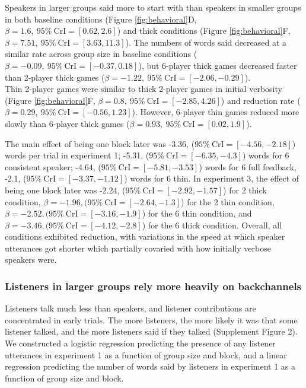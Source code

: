 \documentclass[
  english,
  a4paper,
]{article}
\begin{document}
Speakers in larger groups said more to start with than speakers in smaller groups in both baseline conditions (Figure \ref{fig:behavioral}D, \(\beta=1.6,\:95\%\:\mathrm{CrI}=[0.62, 2.6]\)) and thick conditions (Figure \ref{fig:behavioral}F, \(\beta=7.51,\:95\%\:\mathrm{CrI}=[3.63, 11.3]\)). The numbers of words said decreased at a similar rate across group size in baseline conditions (\(\beta=-0.09,\:95\%\:\mathrm{CrI}=[-0.37, 0.18]\)), but 6-player thick games decreased faster than 2-player thick games (\(\beta=-1.22,\:95\%\:\mathrm{CrI}=[-2.06, -0.29]\)).\\
Thin 2-player games were similar to thick 2-player games in initial verbosity (Figure \ref{fig:behavioral}F, \(\beta=0.8,\:95\%\:\mathrm{CrI}=[-2.85, 4.26]\)) and reduction rate ( \(\beta=0.29,\:95\%\:\mathrm{CrI}=[-0.56, 1.23]\)).
However, 6-player thin games reduced more slowly than 6-player thick games (\(\beta=0.93,\:95\%\:\mathrm{CrI}=[0.02, 1.9]\)).

The main effect of being one block later was -3.36, (\(95\%\:\mathrm{CrI}=[-4.56, -2.18]\)) words per trial in experiment 1; -5.31, (\(95\%\:\mathrm{CrI}=[-6.35, -4.3]\)) words for 6 consistent speaker; -4.64, (\(95\%\:\mathrm{CrI}=[-5.81, -3.53]\)) words for 6 full feedback, -2.1, (\(95\%\:\mathrm{CrI}=[-3.37, -1.12]\)) words for 6 thin.
In experiment 3, the effect of being one block later was -2.24, (\(95\%\:\mathrm{CrI}=[-2.92, -1.57]\)) for 2 thick condition, \(\beta=-1.96, (95\%\:\mathrm{CrI}=[-2.64, -1.3]\)) for the 2 thin condition, \(\beta=-2.52, (95\%\:\mathrm{CrI}=[-3.16, -1.9]\)) for the 6 thin condition, and \(\beta=-3.46, (95\%\:\mathrm{CrI}=[-4.12, -2.8]\)) for the 6 thick condition.
Overall, all conditions exhibited reduction, with variations in the speed at which speaker utterances got shorter which partially covaried with how initially verbose speakers were.

\hypertarget{listeners-in-larger-groups-rely-more-heavily-on-backchannels}{%
\subsubsection{Listeners in larger groups rely more heavily on backchannels}\label{listeners-in-larger-groups-rely-more-heavily-on-backchannels}}

Listeners talk much less than speakers, and listener contributions are concentrated in early trials. The more listeners, the more likely it was that some listener talked, and the more listeners said if they talked (Supplement Figure 2). We constructed a logistic regression predicting the presence of any listener utterances in experiment 1 as a function of group size and block, and a linear regression predicting the number of words said by listeners in experiment 1 as a function of group size and block.
\end{document}
